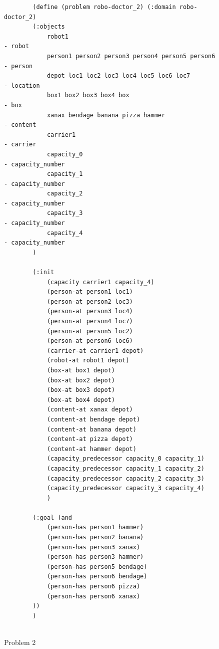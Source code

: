 \begin{figure}[h!]
    \begin{verbatim}
        (define (problem robo-doctor_2) (:domain robo-doctor_2)
        (:objects 
            robot1                                              - robot
            person1 person2 person3 person4 person5 person6     - person
            depot loc1 loc2 loc3 loc4 loc5 loc6 loc7            - location
            box1 box2 box3 box4 box                             - box
            xanax bendage banana pizza hammer                   - content
            carrier1                                            - carrier
            capacity_0                                          - capacity_number
            capacity_1                                          - capacity_number
            capacity_2                                          - capacity_number
            capacity_3                                          - capacity_number
            capacity_4                                          - capacity_number
        )
        
        (:init
            (capacity carrier1 capacity_4)
            (person-at person1 loc1)
            (person-at person2 loc3)
            (person-at person3 loc4)
            (person-at person4 loc7)
            (person-at person5 loc2)
            (person-at person6 loc6)
            (carrier-at carrier1 depot)
            (robot-at robot1 depot)
            (box-at box1 depot)
            (box-at box2 depot)
            (box-at box3 depot)
            (box-at box4 depot)
            (content-at xanax depot)
            (content-at bendage depot)
            (content-at banana depot)
            (content-at pizza depot)
            (content-at hammer depot)
            (capacity_predecessor capacity_0 capacity_1)
            (capacity_predecessor capacity_1 capacity_2)
            (capacity_predecessor capacity_2 capacity_3)
            (capacity_predecessor capacity_3 capacity_4)
            )
        
        (:goal (and
            (person-has person1 hammer)
            (person-has person2 banana)
            (person-has person3 xanax)
            (person-has person3 hammer)
            (person-has person5 bendage)
            (person-has person6 bendage)
            (person-has person6 pizza)
            (person-has person6 xanax)
        ))
        )
        

    \end{verbatim}
    \caption{Problem 2}
    \label{problem2_problem}
\end{figure}


